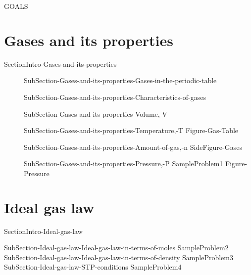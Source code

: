 \documentclass[main.tex]{subfiles}
\newcommand\chapterlabel{ChMIX-biomoleculesinsolution}\setcounter{figurenewcounter}{0}\setcounter{tablenewcounter}{0}\setcounter{formulanewcounter}{0}
\begin{document}
\begin{marginfigure}
\begin{mytcbox}{GOALS}
\end{mytcbox}
\vspace{1cm}
\end{marginfigure}%






\renewcommand\chapterlabel{Ch-Gas}



\section{\faEnvira Gases and its properties} {SectionIntro-Gases-and-its-properties}
\sloppy \begin{description}
\item[]  {SubSection-Gases-and-its-properties-Gases-in-the-periodic-table}
\item[]  {SubSection-Gases-and-its-properties-Characteristics-of-gases}
 \item[] {SubSection-Gases-and-its-properties-Volume,-V}
 \item[]{SubSection-Gases-and-its-properties-Temperature,-T}
 {Figure-Gas-Table}
 \item[] {SubSection-Gases-and-its-properties-Amount-of-gas,-n}
 {SideFigure-Gases}
\item[] {SubSection-Gases-and-its-properties-Pressure,-P}
{SampleProblem1}
 {Figure-Pressure}
\end{description}




 \section{\faEnvira Ideal gas law}{SectionIntro-Ideal-gas-law}
\sloppy \begin{description}
 {SubSection-Ideal-gas-law-Ideal-gas-law-in-terms-of-moles}
{SampleProblem2}
 {SubSection-Ideal-gas-law-Ideal-gas-law-in-terms-of-density}
{SampleProblem3}
 {SubSection-Ideal-gas-law-STP-conditions}
{SampleProblem4}
\end{description}
\end{document}
